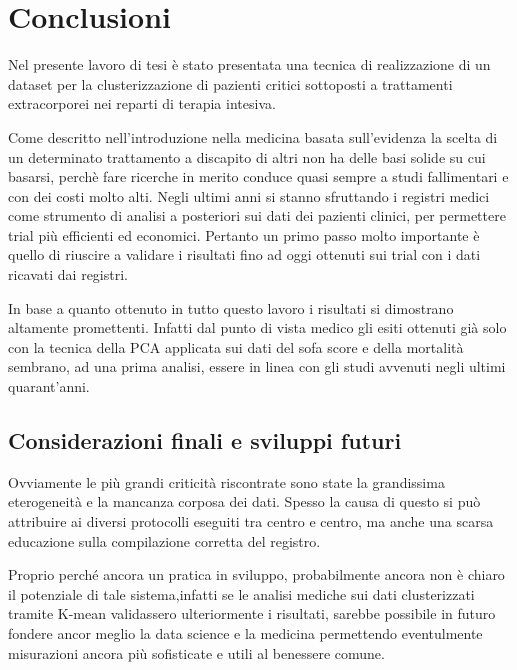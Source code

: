 \chapter{Conclusioni}


Nel presente lavoro di tesi è stato presentata una tecnica di realizzazione di un dataset per la clusterizzazione di pazienti critici sottoposti a trattamenti extracorporei nei reparti di terapia intesiva. 

Come descritto nell'introduzione nella medicina basata sull'evidenza la scelta di un determinato trattamento a discapito di altri non ha delle basi solide su cui basarsi,  perchè fare ricerche in merito conduce quasi sempre a studi fallimentari e con dei costi molto alti.
Negli ultimi anni si stanno sfruttando i registri medici come strumento di analisi a posteriori sui dati dei pazienti clinici, per permettere trial più efficienti ed economici. 
Pertanto un primo passo molto importante è quello di riuscire a validare i risultati fino ad oggi ottenuti sui trial con i dati ricavati dai registri.

In base a quanto ottenuto in tutto questo lavoro i risultati si dimostrano altamente promettenti. Infatti dal punto di vista medico gli esiti ottenuti già solo con la tecnica della PCA applicata sui dati del sofa score e della mortalità sembrano, ad una prima analisi, essere in linea con gli studi avvenuti negli ultimi quarant'anni. 



\section{Considerazioni finali e sviluppi futuri}

Ovviamente le più grandi criticità riscontrate sono state la grandissima eterogeneità e la mancanza corposa dei dati.
Spesso la causa di questo si può attribuire ai diversi protocolli eseguiti tra centro e centro, ma anche una scarsa educazione sulla compilazione corretta del registro.

Proprio perché ancora un pratica in sviluppo, probabilmente ancora non è chiaro il potenziale di tale sistema,infatti se le analisi mediche sui dati clusterizzati tramite K-mean validassero ulteriormente i risultati, sarebbe possibile in futuro fondere ancor meglio la data science e la medicina permettendo eventulmente misurazioni ancora più sofisticate e utili al benessere comune.


